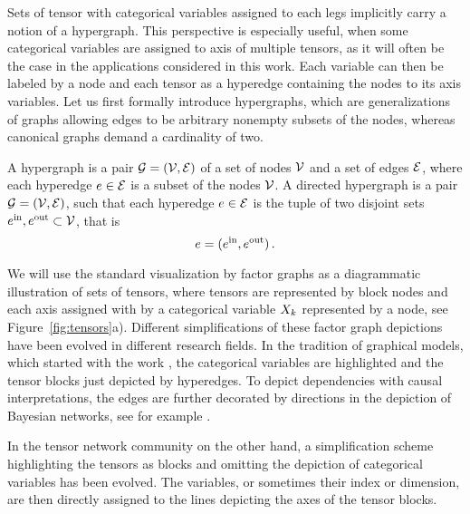 Sets of tensor with categorical variables assigned to each legs implicitly carry a notion of a hypergraph.
This perspective is especially useful, when some categorical variables are assigned to axis of multiple tensors, as it will often be the case in the applications considered in this work.
Each variable can then be labeled by a node and each tensor as a hyperedge containing the nodes to its axis variables.
Let us first formally introduce hypergraphs, which are generalizations of graphs allowing edges to be arbitrary nonempty subsets of the nodes, whereas canonical graphs demand a cardinality of two.

\begin{definition}\label{def:hypergraphs}
	A hypergraph is a pair $\mathcal{G}=(\mathcal{V},\mathcal{E})$ of a set of nodes $\mathcal{V}$ and a set of edges $\mathcal{E}$, where each hyperedge $e\in\mathcal{E}$ is a subset of the nodes $\mathcal{V}$.
	A directed hypergraph is a pair $\mathcal{G}=(\mathcal{V},\mathcal{E})$, such that each hyperedge $e\in\mathcal{E}$ is the tuple of two disjoint sets $e^{\mathrm{in}},e^{\mathrm{out}}\subset\mathcal{V}$, that is
		\[ e = (e^{\mathrm{in}},e^{\mathrm{out}})  \, . \]
\end{definition}

We will use the standard visualization by factor graphs as a diagrammatic illustration of sets of tensors, where tensors are represented by block nodes and each axis assigned with by a categorical variable $X_{k}$ represented by a node, see Figure~\ref{fig:tensors}a). 
Different simplifications of these factor graph depictions have been evolved in different research fields.
In the tradition of graphical models, which started with the work \cite{pearl_probabilistic_1988}, the categorical variables are highlighted and the tensor blocks just depicted by hyperedges.
To depict dependencies with causal interpretations, the edges are further decorated by directions in the depiction of Bayesian networks, see for example \cite{pearl_causality_2009}.

In the tensor network community on the other hand, a simplification scheme highlighting the tensors as blocks and omitting the depiction of categorical variables has been evolved.
The variables, or sometimes their index or dimension, are then directly assigned to the lines depicting the axes of the tensor blocks.


